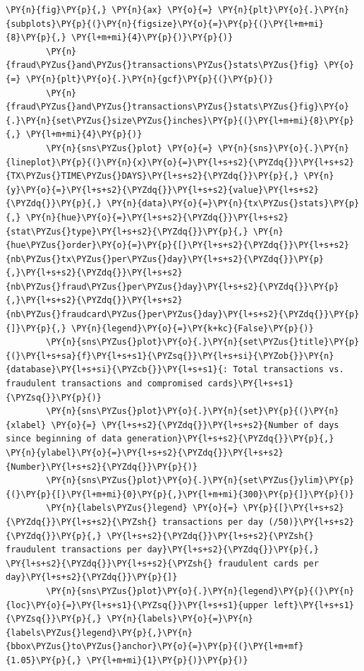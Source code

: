 \begin{tcolorbox}[breakable, size=fbox, boxrule=1pt, pad at break*=1mm,colback=cellbackground, colframe=cellborder]
\begin{Verbatim}[commandchars=\\\{\}]
        \PY{n}{fig}\PY{p}{,} \PY{n}{ax} \PY{o}{=} \PY{n}{plt}\PY{o}{.}\PY{n}{subplots}\PY{p}{(}\PY{n}{figsize}\PY{o}{=}\PY{p}{(}\PY{l+m+mi}{8}\PY{p}{,} \PY{l+m+mi}{4}\PY{p}{)}\PY{p}{)}
        \PY{n}{fraud\PYZus{}and\PYZus{}transactions\PYZus{}stats\PYZus{}fig} \PY{o}{=} \PY{n}{plt}\PY{o}{.}\PY{n}{gcf}\PY{p}{(}\PY{p}{)}
        \PY{n}{fraud\PYZus{}and\PYZus{}transactions\PYZus{}stats\PYZus{}fig}\PY{o}{.}\PY{n}{set\PYZus{}size\PYZus{}inches}\PY{p}{(}\PY{l+m+mi}{8}\PY{p}{,} \PY{l+m+mi}{4}\PY{p}{)}
        \PY{n}{sns\PYZus{}plot} \PY{o}{=} \PY{n}{sns}\PY{o}{.}\PY{n}{lineplot}\PY{p}{(}\PY{n}{x}\PY{o}{=}\PY{l+s+s2}{\PYZdq{}}\PY{l+s+s2}{TX\PYZus{}TIME\PYZus{}DAYS}\PY{l+s+s2}{\PYZdq{}}\PY{p}{,} \PY{n}{y}\PY{o}{=}\PY{l+s+s2}{\PYZdq{}}\PY{l+s+s2}{value}\PY{l+s+s2}{\PYZdq{}}\PY{p}{,} \PY{n}{data}\PY{o}{=}\PY{n}{tx\PYZus{}stats}\PY{p}{,} \PY{n}{hue}\PY{o}{=}\PY{l+s+s2}{\PYZdq{}}\PY{l+s+s2}{stat\PYZus{}type}\PY{l+s+s2}{\PYZdq{}}\PY{p}{,} \PY{n}{hue\PYZus{}order}\PY{o}{=}\PY{p}{[}\PY{l+s+s2}{\PYZdq{}}\PY{l+s+s2}{nb\PYZus{}tx\PYZus{}per\PYZus{}day}\PY{l+s+s2}{\PYZdq{}}\PY{p}{,}\PY{l+s+s2}{\PYZdq{}}\PY{l+s+s2}{nb\PYZus{}fraud\PYZus{}per\PYZus{}day}\PY{l+s+s2}{\PYZdq{}}\PY{p}{,}\PY{l+s+s2}{\PYZdq{}}\PY{l+s+s2}{nb\PYZus{}fraudcard\PYZus{}per\PYZus{}day}\PY{l+s+s2}{\PYZdq{}}\PY{p}{]}\PY{p}{,} \PY{n}{legend}\PY{o}{=}\PY{k+kc}{False}\PY{p}{)}
        \PY{n}{sns\PYZus{}plot}\PY{o}{.}\PY{n}{set\PYZus{}title}\PY{p}{(}\PY{l+s+sa}{f}\PY{l+s+s1}{\PYZsq{}}\PY{l+s+si}{\PYZob{}}\PY{n}{database}\PY{l+s+si}{\PYZcb{}}\PY{l+s+s1}{: Total transactions vs. fraudulent transactions and compromised cards}\PY{l+s+s1}{\PYZsq{}}\PY{p}{)}
        \PY{n}{sns\PYZus{}plot}\PY{o}{.}\PY{n}{set}\PY{p}{(}\PY{n}{xlabel} \PY{o}{=} \PY{l+s+s2}{\PYZdq{}}\PY{l+s+s2}{Number of days since beginning of data generation}\PY{l+s+s2}{\PYZdq{}}\PY{p}{,} \PY{n}{ylabel}\PY{o}{=}\PY{l+s+s2}{\PYZdq{}}\PY{l+s+s2}{Number}\PY{l+s+s2}{\PYZdq{}}\PY{p}{)}
        \PY{n}{sns\PYZus{}plot}\PY{o}{.}\PY{n}{set\PYZus{}ylim}\PY{p}{(}\PY{p}{[}\PY{l+m+mi}{0}\PY{p}{,}\PY{l+m+mi}{300}\PY{p}{]}\PY{p}{)}
        \PY{n}{labels\PYZus{}legend} \PY{o}{=} \PY{p}{[}\PY{l+s+s2}{\PYZdq{}}\PY{l+s+s2}{\PYZsh{} transactions per day (/50)}\PY{l+s+s2}{\PYZdq{}}\PY{p}{,} \PY{l+s+s2}{\PYZdq{}}\PY{l+s+s2}{\PYZsh{} fraudulent transactions per day}\PY{l+s+s2}{\PYZdq{}}\PY{p}{,} \PY{l+s+s2}{\PYZdq{}}\PY{l+s+s2}{\PYZsh{} fraudulent cards per day}\PY{l+s+s2}{\PYZdq{}}\PY{p}{]}
        \PY{n}{sns\PYZus{}plot}\PY{o}{.}\PY{n}{legend}\PY{p}{(}\PY{n}{loc}\PY{o}{=}\PY{l+s+s1}{\PYZsq{}}\PY{l+s+s1}{upper left}\PY{l+s+s1}{\PYZsq{}}\PY{p}{,} \PY{n}{labels}\PY{o}{=}\PY{n}{labels\PYZus{}legend}\PY{p}{,}\PY{n}{bbox\PYZus{}to\PYZus{}anchor}\PY{o}{=}\PY{p}{(}\PY{l+m+mf}{1.05}\PY{p}{,} \PY{l+m+mi}{1}\PY{p}{)}\PY{p}{)}


\end{Verbatim}
\end{tcolorbox}
